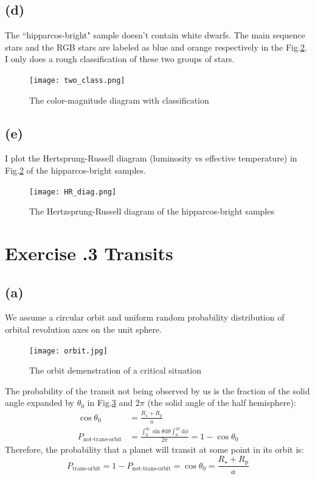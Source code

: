 \documentclass[a4paper,12pt]{article}
\begin{document}
\subsection*{(d)}
The ``hipparcos-bright" sample doesn't contain white dwarfs. The main sequence 
stars and the RGB stars are labeled as 
blue and orange respectively in the Fig.\ref{class}. 
I only does a rough classification of these two groups of stars.
\begin{figure}[htbp]
    \centering
    \texttt{[image: two\_class.png]}
    \caption{The color-magnitude diagram with classification}
    \label{class}
\end{figure}

\subsection*{(e)}
I plot the Hertsprung-Russell diagram (luminosity vs effective temperature) in 
Fig.\ref{class}
of the hipparcos-bright samples. 

\begin{figure}[htbp]
    \centering
    \texttt{[image: HR\_diag.png]}
    \caption{The Hertzsprung-Russell diagram of the hipparcos-bright samples}
    \label{class}
\end{figure}


\section*{\textbf{Exercise \uppercase\expandafter{}.3 Transits}}
\subsection*{(a)}
We assume a circular orbit and uniform random probability distribution of orbital revolution axes on the unit sphere.
\begin{figure}[htbp]
    \centering
    \texttt{[image: orbit.jpg]}
    \caption{The orbit demenstration of a critical situation}
    \label{orbit}
\end{figure}

The probability of the transit not being observed by us is the fraction of 
the solid angle expanded by $\theta_0$ in Fig.\ref{orbit} and $2\pi$ (the solid angle of the half hemisphere):
\begin{align}
    \cos \theta_0 &= \frac{R_{\star}+R_\text{p}}{a} \\
    P_{\text{not-trans-orbit}} &= \frac{\int_{0}^{\theta_0}  \sin\theta \text{d}\theta \int_{0}^{2\pi} \text{d}\phi}{2 \pi}
                    = 1-\cos \theta_0
\end{align}
Therefore, the probability that a planet will transit at some point in its orbit is:
\begin{equation}
    P_{\text{trans-orbit}} = 1 - P_{\text{not-trans-orbit}} = \cos \theta_0 = \frac{R_{\star} + R_{\text{p}}}{a}
\end{equation}
\end{document}
